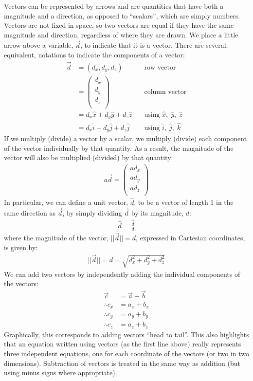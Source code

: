\begin{chapterSummary}
Vectors can be represented by arrows and are quantities that have both a magnitude and a direction, as opposed to ``scalars'', which are simply numbers. Vectors are not fixed in space, so two vectors are equal if they have the same magnitude and direction, regardless of where they are drawn. We place a little arrow above a variable, $\vec d$, to indicate that it is a vector. There are several, equivalent, notations to indicate the components of a vector:
\begin{align*}
\vec d &= (d_x,d_y, d_z)\quad&\text{row vector}\\
       &=\begin{pmatrix}
           d_x \\
           d_y \\
           d_z\\
         \end{pmatrix}\quad&\text{column vector}\\
         &= d_x\hat x +d_y \hat y +d_z \hat z\quad&\text{using }\hat x,\;\hat y,\;\hat z\\
         &=d_x\hat i +d_y \hat j+d_z \hat j \quad&\text{using }\hat i,\;\hat j,\;\hat k
\end{align*}
If we multiply (divide) a vector by a scalar, we multiply (divide) each component of the vector individually by that quantity. As a result, the magnitude of the vector will also be multiplied (divided) by that quantity:
\begin{align*}
a\vec d = \begin{pmatrix}
           ad_x \\
           ad_y \\
           ad_z \\
         \end{pmatrix}
\end{align*}
In particular, we can define a unit vector, $\hat d$, to be a vector of length 1 in the same direction as $\vec d$, by simply dividing $\vec d$ by its magnitude, $d$:
\begin{align*}
\hat d = \frac{\vec d}{d}
\end{align*}
where the magnitude of the vector, $||\vec d|| = d$, expressed in Cartesian coordinates, is given by:
\begin{align*}
||\vec d|| = d =\sqrt{d_x^2+d_y^2+d_z^2}
\end{align*}
We can add two vectors by independently adding the individual components of the vectors:
\begin{align*}
\vec c &= \vec a + \vec b\\
\therefore c_x &= a_x + b_x\\
\therefore c_y &= a_y + b_y\\
\therefore c_z &= a_z + b_z
\end{align*}
Graphically, this corresponds to adding vectors ``head to tail''. This also highlights that an equation written using vectors (as the first line above) really represents three independent equations, one for each coordinate of the vectors (or two in two dimensions). Subtraction of vectors is treated in the same way as addition (but using minus signs where appropriate).


\end{chapterSummary}
